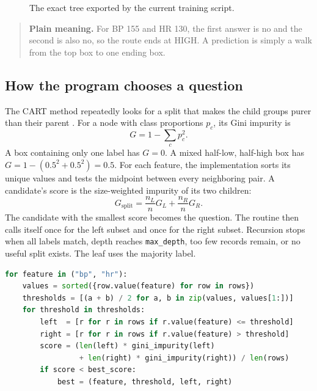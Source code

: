 \documentclass[12pt,a4paper,openany]{report}
\newcommand{\plainmeaning}[1]{%
  \begin{quote}
    \color{navy}\textbf{Plain meaning.} #1
  \end{quote}
}
\newcommand{\sourcepath}[1]{\texttt{#1}}
\begin{document}
\begin{figure}[H]
\centering
{}
\caption{The exact tree exported by the current training script.}
\label{fig:dt-tree}
\end{figure}

\plainmeaning{For BP 155 and HR 130, the first answer is no and the second is
also no, so the route ends at HIGH. A prediction is simply a walk from the top
box to one ending box.}

\subsection{How the program chooses a question}
The CART method repeatedly looks for a split that makes the child groups purer
than their parent \cite{breiman}. For a node with class proportions $p_c$, its
Gini impurity is
\begin{equation}
  G=1-\sum_c p_c^2.
\end{equation}
A box containing only one label has $G=0$. A mixed half-low, half-high box has
$G=1-(0.5^2+0.5^2)=0.5$. For each feature, the implementation sorts its unique
values and tests the midpoint between every neighboring pair. A candidate's
score is the size-weighted impurity of its two children:
\begin{equation}
 G_{\mathrm{split}}=\frac{n_L}{n}G_L+\frac{n_R}{n}G_R.
\end{equation}
The candidate with the smallest score becomes the question. The routine then
calls itself once for the left subset and once for the right subset. Recursion
stops when all labels match, depth reaches \texttt{max\_depth}, too few records
remain, or no useful split exists. The leaf uses the majority label.

\begin{lstlisting}[language=Python,caption={Core split search, simplified from \sourcepath{decisionTree/decision\_tree\_model.py}.}]
for feature in ("bp", "hr"):
    values = sorted({row.value(feature) for row in rows})
    thresholds = [(a + b) / 2 for a, b in zip(values, values[1:])]
    for threshold in thresholds:
        left  = [r for r in rows if r.value(feature) <= threshold]
        right = [r for r in rows if r.value(feature) > threshold]
        score = (len(left) * gini_impurity(left)
                 + len(right) * gini_impurity(right)) / len(rows)
        if score < best_score:
            best = (feature, threshold, left, right)
\end{lstlisting}
\end{document}

